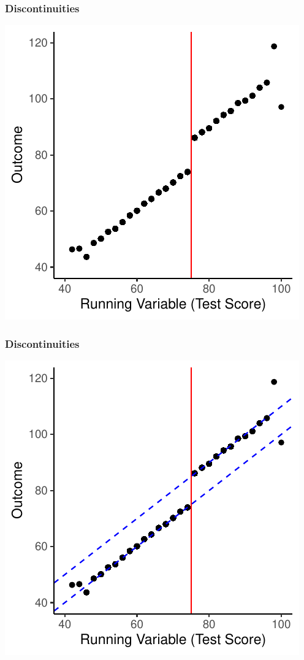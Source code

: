 \documentclass[xcolor=x11names,compress]{beamer}\usepackage[]{graphicx}\usepackage[]{color}
\makeatletter
\def\maxwidth{ %
  \ifdim\Gin@nat@width>\linewidth
    \linewidth
  \else
    \Gin@nat@width
  \fi
}
\newenvironment{knitrout}{}{} %
\renewcommand{\(}{\begin{columns}}
\renewcommand{\)}{\end{columns}}
\newcommand{\<}[1]{\begin{column}{#1}}
\renewcommand{\>}{\end{column}}
\makeatother
\begin{document}
\begin{frame}
\frametitle{Discontinuities}
\begin{knitrout}
\color{fgcolor}
\includegraphics[width=\maxwidth]{figure/chart2_binned_0-1} 

\end{knitrout}
\end{frame}

\begin{frame}
\frametitle{Discontinuities}
\begin{knitrout}
\color{fgcolor}
\includegraphics[width=\maxwidth]{figure/chart2_binned_1-1} 

\end{knitrout}
\end{frame}
\end{document}
